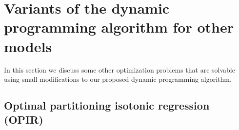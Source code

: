 \documentclass{article}
\begin{document}
\section{Variants of the dynamic programming algorithm for other models}

In this section we discuss some other optimization problems that are
solvable using small modifications to our proposed dynamic programming
algorithm.



\subsection{Optimal partitioning isotonic regression (OPIR)}
\end{document}
